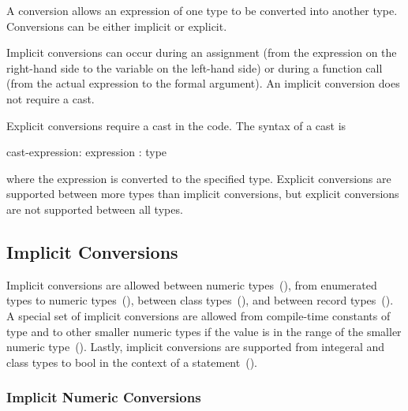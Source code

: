 \label{Conversions}

A conversion allows an expression of one type to be converted into
another type.  Conversions can be either implicit or explicit.

Implicit conversions can occur during an assignment (from the
expression on the right-hand side to the variable on the left-hand
side) or during a function call (from the actual expression to the
formal argument).  An implicit conversion does not require a cast.

Explicit conversions require a cast in the code.  The syntax of a cast
is
\begin{syntax}
cast-expression:
  expression : type
\end{syntax}
where the expression is converted to the specified type.  Explicit
conversions are supported between more types than implicit
conversions, but explicit conversions are not supported between all
types.

\subsection{Implicit Conversions}
\label{Implicit_Conversions}

Implicit conversions are allowed between numeric
types~(), from enumerated types to
numeric types~(), between class
types~(), and between record
types~().  A special set of implicit
conversions are allowed from compile-time constants of type 
and  to other smaller numeric types if the value is in
the range of the smaller numeric
type~().  Lastly,
implicit conversions are supported from integeral and class types to
bool in the context of a
statement~().

\subsubsection{Implicit Numeric Conversions}
\label{Implicit_Numeric_Conversions}

